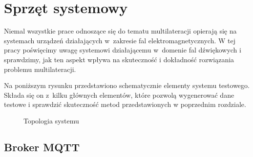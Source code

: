\chapter{Sprzęt systemowy}\label{chap:hardware}

Niemal wszystkie prace odnoszące się do tematu multilateracji opierają się na systemach urządzeń działających w~zakresie fal elektromagnetycznych. W tej pracy poświęcimy uwagę systemowi działającemu w~domenie fal dźwiękowych i sprawdzimy, jak ten aspekt wpływa na skuteczność i dokładność rozwiązania problemu multilateracji.

Na poniższym rysunku przedstawiono schematycznie elementy systemu testowego. Składa się on z~kilku głównych elementów, które pozwolą wygenerować dane testowe i sprawdzić skuteczność metod przedstawionych w poprzednim rozdziale.

\begin{figure}[H]
\centering
{}
\caption{Topologia systemu}
\label{pic:sys_topology}
\end{figure}

\section{Broker MQTT}

